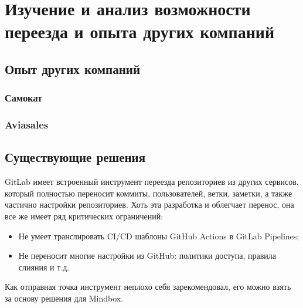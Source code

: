 \chapter{Изучение и анализ возможности переезда и опыта других компаний} \label{ch:ch1}

\section{Опыт других компаний}\label{sec:other-companies-expirience}

\subsection{Самокат}\label{subsec:samokat-experience}

\subsection{Aviasales}\label{subsec:aviasales-experience}

\section{Существующие решения}\label{sec:existing-solutions}
GitLab имеет встроенный инструмент переезда репозиториев из других сервисов,
который полностью переносит коммиты, пользователей, ветки, заметки, а также частично настройки репозиториев.
Хоть эта разработка и облегчает перенос, она все же имеет ряд критических ограничений:
\begin{itemize}
  \item Не умеет транслировать CI/CD шаблоны GitHub Actions в GitLab Pipelines;
  \item Не переносит многие настройки из GitHub: политики доступа, правила слияния и т.д.
\end{itemize}
Как отправная точка инструмент неплохо себя зарекомендовал, его можно взять за основу решения для Mindbox.
